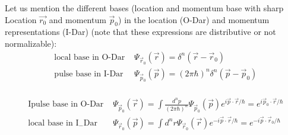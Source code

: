 Let us mention the different bases (location and momentum base with sharp
Location $\vec{r_0}$ and momentum $\vec{p}_0$) in the location (O-Dar) and momentum representations
(I-Dar) (note that these expressions are distributive or not normalizable):
\\
\begin{equation}
\begin{array}{ll}{\text { local base in O-Dar }} & {\Psi_{\vec{r}_{0}}(\vec{r})=\delta^{n}\left(\vec{r}-\vec{r}_{0}\right)} \\ {\text { pulse base in I-Dar }} & {\Psi_{\vec{p}_{0}}(\vec{p})=(2 \pi \hbar)^{n} \delta^{n}\left(\vec{p}-\vec{p}_{0}\right)}\end{array}
\end{equation}\\

\begin{equation}
\begin{array}{ll}{\text { Ipulse base in O-Dar }} & {\Psi_{\vec{p}_{0}}(\vec{r})=\int \frac{d^{n} p}{(2 \pi \hbar)^{n}} \Psi_{\vec{p}_{0}}(\vec{p}) e^{i \vec{p} \cdot \vec{r} / \hbar}=e^{i \vec{p}_{0} \cdot \vec{r} / \hbar}} \\ {\text { local base in } \mathrm{I}_{-} \mathrm{Dar}} & {\Psi_{\vec{r}_{0}}(\vec{p})=\int d^{n} r \Psi_{\vec{r}_{0}}(\vec{r}) e^{-i \vec{p} \cdot \vec{r} / \hbar}=e^{-i \vec{p} \cdot \vec{r}_{0} / \hbar}}\end{array}
\end{equation}\\
%
\newpage